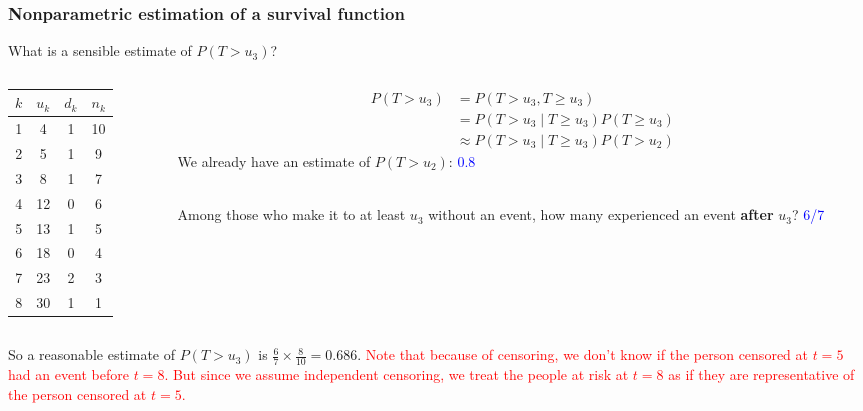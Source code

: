 \documentclass[10pt,t]{beamer}
\begin{document}
\begin{frame}
	\frametitle{Nonparametric estimation of a survival function}
	\vspace{-0.5cm}
	What is a sensible estimate of $P(T > u_3)$?
	
	\begin{columns}
		\begin{column}{0.3\textwidth}
			\begin{center}

\begin{tabular}{|c|c|c|c|}
	\hline
	$k$ & $u_k$ & $d_k$ & $n_k$ \\
	\hline
	1 & 4 & 1 & 10 \\
	2& 5 & 1 & 9 \\
	3& 8 & 1 & 7 \\
	4&12 & 0 & 6 \\
	5&13 & 1 & 5 \\
	6&18 & 0 & 4 \\
	7&23 & 2 & 3 \\
	8&30 & 1 & 1 \\
	\hline
\end{tabular}

			\end{center}
		\end{column}
		\begin{column}{0.7\textwidth}  %
			\begin{align*}
				P(T > u_3) &= P(T > u_3, T\geq u_3) \\
				&= P(T > u_3 \mid T \geq u_3)P(T \geq u_3)\\
				&\approx P(T > u_3 \mid T \geq u_3)P(T > u_2)
			\end{align*}
			We already have an estimate of $P(T > u_2)$: \textcolor{blue}{0.8}\pause 
			\\ ~\ 
			
			Among those who make it to at least $u_3$ without an event, how many experienced an event \textbf{after} $u_3$? \pause \textcolor{blue}{6/7}
		\end{column}
	\end{columns}
	\vspace{0.5cm}
	So a reasonable estimate of $P(T > u_3)$ is $\frac{6}{7} \times \frac{8}{10} = 0.686$. \textcolor{red}{Note that because of censoring, we don't know if the person censored at $t = 5$ had an event before $t = 8$. But since we assume independent censoring, we treat the people at risk at $t = 8$ as if they are representative of the person censored at $t = 5$.}   
\end{frame}
\end{document}

